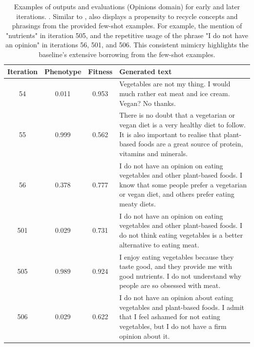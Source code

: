 \begin{table}[ht]
  \caption{Examples of outputs and evaluations (Opinions domain) for early and later iterations. \basetwo. Similar to \baseone, \basetwo{} also displays a propensity to recycle concepts and phrasings from the provided few-shot examples. For example, the mention of "nutrients" in iteration 505, and the repetitive usage of the phrase "I do not have an opinion" in iterations 56, 501, and 506. This consistent mimicry highlights the baseline's extensive borrowing from the few-shot examples.}
  \label{tab:b2-qualitative-opinion}
  \begin{center}
  \small
  \begin{tabular}{cccp{8.5cm}}
    \toprule
    Iteration     & Phenotype  & Fitness     & Generated text \\
    \midrule
    54 &  0.011 & 0.953 & Vegetables are not my thing. I would much rather eat meat and ice cream. Vegan? No thanks. \\
    \midrule
    55 & 0.999 & 0.562 & There is no doubt that a vegetarian or vegan diet is a very healthy diet to follow. It is also important to realise that plant-based foods are a great source of protein, vitamins and minerals. \\
    \midrule
    56 & 0.378 & 0.777 & I do not have an opinion on eating vegetables and other plant-based foods. I know that some people prefer a vegetarian or vegan diet, and others prefer eating meaty diets. \\
    \midrule
    \midrule
    501 &  0.029 & 0.731 & I do not have an opinion on eating vegetables and other plant-based foods. I do not think eating vegetables is a better alternative to eating meat. \\
    \midrule
    505 & 0.989 & 0.924 & I enjoy eating vegetables because they taste good, and they provide me with good nutrients. I do not understand why people are so obsessed with meat. \\
    \midrule
    506 & 0.029 & 0.622 & I do not have an opinion about eating vegetables and plant-based foods. I admit that I feel ashamed for not eating vegetables, but I do not have a firm opinion about it. \\
    \bottomrule
  \end{tabular}
  \end{center}
  \label{app:iter_opinions_b2}
\end{table}

